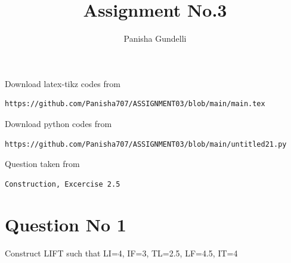\documentclass[journal,12pt,twocolumn]{IEEEtran}
\begin{document}
\makeatother
\let\StandardTheFigure\thefigure
\let\vec\mathbf
\renewcommand{\thefigure}{\theproblem}
\def\putbox#1#2#3{\makebox[0in][l]{\makebox[#1][l]{}\raisebox{\baselineskip}[0in][0in]{\raisebox{#2}[0in][0in]{#3}}}}
     \def\rightbox#1{\makebox[0in][r]{#1}}
     \def\centbox#1{\makebox[0in]{#1}}
     \def\topbox#1{\raisebox{-\baselineskip}[0in][0in]{#1}}
     \def\midbox#1{\raisebox{-0.5\baselineskip}[0in][0in]{#1}}
\vspace{3cm}
\title{Assignment No.3}
\author{Panisha Gundelli}
\maketitle
\newpage
\bigskip
\renewcommand{\thefigure}{\theenumi}
\renewcommand{\thetable}{\theenumi}
Download latex-tikz codes from
\begin{lstlisting}
https://github.com/Panisha707/ASSIGNMENT03/blob/main/main.tex
\end{lstlisting}
%
Download python codes from
\begin{lstlisting}
https://github.com/Panisha707/ASSIGNMENT03/blob/main/untitled21.py
\end{lstlisting}
%
Question taken from
\begin{lstlisting}
Construction, Excercise 2.5
\end{lstlisting}
\section{Question No 1}
Construct LIFT such that LI=4, IF=3, TL=2.5, LF=4.5, IT=4
\end{document}
